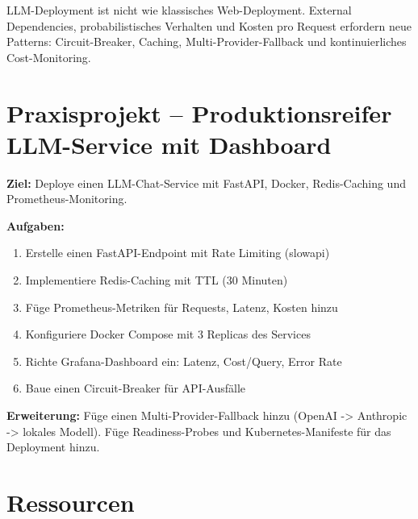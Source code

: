 \begin{merke}
LLM-Deployment ist nicht wie klassisches Web-Deployment. External Dependencies, probabilistisches Verhalten und Kosten pro Request erfordern neue Patterns: Circuit-Breaker, Caching, Multi-Provider-Fallback und kontinuierliches Cost-Monitoring.
\end{merke}

\section{Praxisprojekt -- Produktionsreifer LLM-Service mit Dashboard}

\textbf{Ziel:} Deploye einen LLM-Chat-Service mit FastAPI, Docker, Redis-Caching und Prometheus-Monitoring.

\textbf{Aufgaben:}
\begin{enumerate}[leftmargin=*]
    \item Erstelle einen FastAPI-Endpoint mit Rate Limiting (slowapi)
    \item Implementiere Redis-Caching mit TTL (30 Minuten)
    \item Füge Prometheus-Metriken für Requests, Latenz, Kosten hinzu
    \item Konfiguriere Docker Compose mit 3 Replicas des Services
    \item Richte Grafana-Dashboard ein: Latenz, Cost/Query, Error Rate
    \item Baue einen Circuit-Breaker für API-Ausfälle
\end{enumerate}

\textbf{Erweiterung:} Füge einen Multi-Provider-Fallback hinzu (OpenAI -> Anthropic -> lokales Modell).
Füge Readiness-Probes und Kubernetes-Manifeste für das Deployment hinzu.

\section{Ressourcen}

